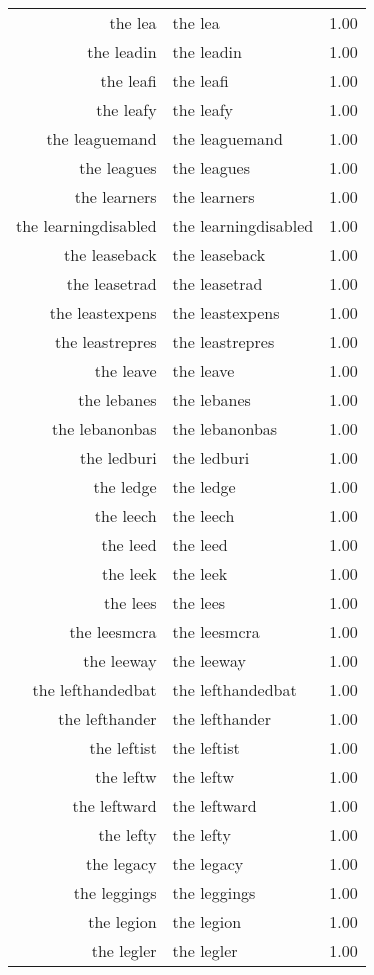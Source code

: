 \begin{table}[ht]
\begin{tabular}{rlr}
  the lea & the lea & 1.00 \\ 
  the leadin & the leadin & 1.00 \\ 
  the leafi & the leafi & 1.00 \\ 
  the leafy & the leafy & 1.00 \\ 
  the leaguemand & the leaguemand & 1.00 \\ 
  the leagues & the leagues & 1.00 \\ 
  the learners & the learners & 1.00 \\ 
  the learningdisabled & the learningdisabled & 1.00 \\ 
  the leaseback & the leaseback & 1.00 \\ 
  the leasetrad & the leasetrad & 1.00 \\ 
  the leastexpens & the leastexpens & 1.00 \\ 
  the leastrepres & the leastrepres & 1.00 \\ 
  the leave & the leave & 1.00 \\ 
  the lebanes & the lebanes & 1.00 \\ 
  the lebanonbas & the lebanonbas & 1.00 \\ 
  the ledburi & the ledburi & 1.00 \\ 
  the ledge & the ledge & 1.00 \\ 
  the leech & the leech & 1.00 \\ 
  the leed & the leed & 1.00 \\ 
  the leek & the leek & 1.00 \\ 
  the lees & the lees & 1.00 \\ 
  the leesmcra & the leesmcra & 1.00 \\ 
  the leeway & the leeway & 1.00 \\ 
  the lefthandedbat & the lefthandedbat & 1.00 \\ 
  the lefthander & the lefthander & 1.00 \\ 
  the leftist & the leftist & 1.00 \\ 
  the leftw & the leftw & 1.00 \\ 
  the leftward & the leftward & 1.00 \\ 
  the lefty & the lefty & 1.00 \\ 
  the legacy & the legacy & 1.00 \\ 
  the leggings & the leggings & 1.00 \\ 
  the legion & the legion & 1.00 \\ 
  the legler & the legler & 1.00 \\ 

\end{tabular}
\end{table}
